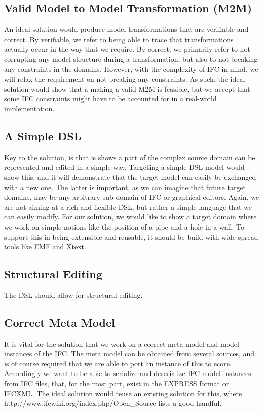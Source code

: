 \subsection{Valid Model to Model Transformation (M2M)}
An ideal solution would produce model transformations that are verifiable and correct. By verifiable, we refer to being able to trace that transformations actually occur in the way that we require. By correct, we primarily refer to not corrupting any model structure during a transformation, but also to not breaking any constraints in the domains. However, with the complexity of IFC in mind, we will relax the requirement on not breaking any constraints. As such, the ideal solution would show that a making a valid M2M is feasible, but we accept that some IFC constraints might have to be accounted for in a real-world implementation.

\subsection{A Simple DSL}
Key to the solution, is that is shows a part of the complex source domain can be represented and edited in a simple way. Targeting a simple DSL model would show this, and it will demonstrate that the target model can easily be exchanged with a new one. The latter is important, as we can imagine that future target domains, may be any arbitrary sub-domain of IFC or graphical editors. Again, we are not aiming at a rich and flexible DSL, but rather a simple language that we can easily modify. For our solution, we would like to show a target domain where we work on simple notions like the position of a pipe and a hole in a wall. To support this in being extensible and reusable, it should be build with wide-spread tools like EMF and Xtext.

\subsection{Structural Editing}
The DSL should allow for structural editing.

\subsection{Correct Meta Model}
It is vital for the solution that we work on a correct meta model and model instances of the IFC. The meta model can be obtained from several sources,
and is of course required that we are able to port an instance of this to ecore. Accordingly we want to be able to serialize and deserialize IFC model instances from IFC files, that, for the most part, exist in the EXPRESS format or IFCXML. The ideal solution would reuse an existing solution for this, where http://www.ifcwiki.org/index.php/Open\_Source lists a good handful.


